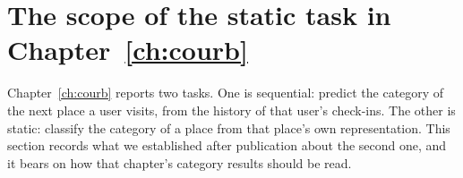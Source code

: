 
\section{The scope of the static task in Chapter~\ref{ch:courb}}
\label{apx:errata:static-scope}

Chapter~\ref{ch:courb} reports two tasks. One is sequential: predict the category of the
next place a user visits, from the history of that user's check-ins. The other is static:
classify the category of a place from that place's own representation. This section
records what we established after publication about the second one, and it bears on how
that chapter's category results should be read.

